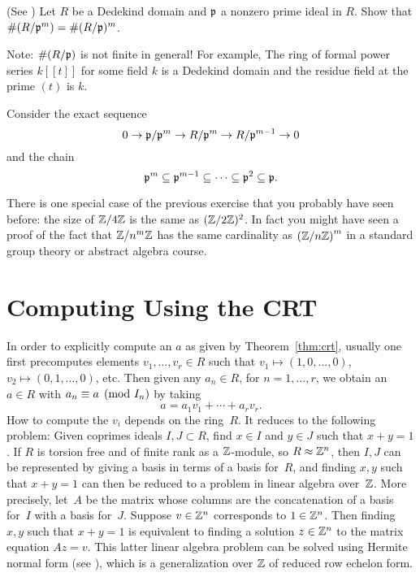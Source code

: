 \begin{exercise}\label{ex:residuefieldofpower}(See \cite[Theorem~22(a)]{marcus1977number}) %
	Let $R$ be a Dedekind domain and $\mathfrak{p}$ a nonzero prime ideal in $R$.
	Show that $\#(R/\mathfrak{p}^m) = \#(R/\mathfrak{p})^m$.
	
	Note: $\#(R/\mathfrak{p})$ is not finite in general! For example,
	The ring of formal power series $k[[t]]$ for some field $k$
	is a Dedekind domain and the residue field at the prime $(t)$
	is $k$.
	
	\begin{hint}
		Consider the exact sequence
		$$
			0\to \mathfrak{p}/\mathfrak{p}^{m} \to R/\mathfrak{p}^{m} \to R/\mathfrak{p}^{m-1} \to 0
		$$
		and the chain
		$$
			\mathfrak{p}^m \subseteq \mathfrak{p}^{m-1}
			\subseteq \cdots \subseteq \mathfrak{p}^2 \subseteq \mathfrak{p}.
		$$
	\end{hint}
\end{exercise}

\begin{remark}
	There is one special case of the previous exercise that you probably
	have seen before: the size of $\mathbb{Z}/4\mathbb{Z}$ is the same as
	$(\mathbb{Z}/2\mathbb{Z})^2$. In fact you might have seen a proof of
	the fact that $\mathbb{Z}/n^m\mathbb{Z}$ has the same cardinality as $\left(\mathbb{Z}/n\mathbb{Z}\right)^m$
	in a standard group theory or abstract algebra course.
\end{remark}

\section{Computing Using the CRT}
In order to explicitly compute an $a$ as given by Theorem~\ref{thm:crt},
usually one first precomputes elements $v_1, \ldots, v_r \in R$ such that
$v_1\mapsto (1,0,\ldots, 0)$, 
$v_2\mapsto (0,1,\ldots, 0)$, etc.
Then given any $a_n \in R$, for $n=1,\ldots, r$, we obtain an $a \in R$
with $a_n\equiv a\pmod{I_n}$ by taking
$$
  a = a_1 v_1 + \cdots + a_r v_r.
$$
How to compute the $v_i$ depends on the ring~$R$.   It reduces to
the following problem: Given coprimes ideals $I,J\subset R$, find
$x\in I$ and $y\in J$ such that $x+y=1$.   If $R$ is torsion free and
of finite rank 
as a $\mathbb{Z}$-module, so $R\approx \mathbb{Z}^n$,
then $I, J$ can be represented by giving a basis in terms of a basis
for~$R$, and finding $x,y$ such  that $x+y=1$ can then be reduced to 
a problem in linear algebra over~$\mathbb{Z}$.  
More precisely, let~$A$
be the matrix whose columns are the concatenation of a basis for~$I$
with a basis for~$J$.  
Suppose $v\in \mathbb{Z}^n$ corresponds to $1\in\mathbb{Z}^n$.
Then finding $x,y$ such that $x+y=1$ is equivalent to
finding a solution $z\in \mathbb{Z}^n$ to the matrix equation
$Az = v$. This latter linear algebra problem
can be solved using Hermite normal form 
(see \cite[\S4.7.1]{cohen:course_ant}),
which is a generalization over $\mathbb{Z}$
of reduced row echelon form.

